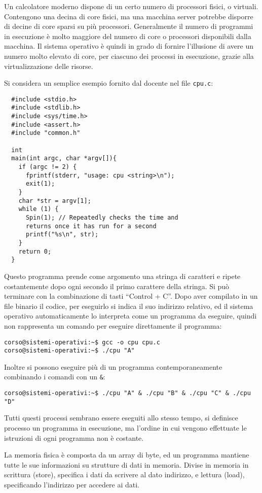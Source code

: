 \documentclass{article}
\numberwithin{equation}{subsection}
\begin{document}
Un calcolatore moderno dispone di un certo numero di processori fisici, o virtuali. Contengono una decina di core fisici, ma una macchina server potrebbe disporre di 
decine di core sparsi su più processori. Generalmente il numero di programmi in esecuzione è molto maggiore del numero di core o processori disponibili dalla macchina. 
Il sistema operativo è quindi in grado di fornire l'illusione di avere un numero molto elevato di core, per ciascuno dei processi in esecuzione, grazie alla virtualizzazione 
delle risorse. 

Si considera un semplice esempio fornito dal docente nel file \verb|cpu.c|:
\begin{verbatim}
  #include <stdio.h>
  #include <stdlib.h>
  #include <sys/time.h>
  #include <assert.h>
  #include "common.h"

  int
  main(int argc, char *argv[]){
    if (argc != 2) {
      fprintf(stderr, "usage: cpu <string>\n");
      exit(1);
    }
    char *str = argv[1];
    while (1) {
      Spin(1); // Repeatedly checks the time and
      returns once it has run for a second
      printf("%s\n", str);
    }
    return 0;
  }
\end{verbatim}


Questo programma prende come argomento una stringa di caratteri e ripete costantemente dopo ogni secondo il primo carattere della stringa. Si può terminare con la 
combinazione di tasti ``Control + C''. Dopo aver compilato in un file binario il codice, per eseguirlo si indica il suo indirizzo relativo, ed il sistema operativo automaticamente lo interpreta come un 
programma da eseguire, quindi non rappresenta un comando per eseguire direttamente il programma:
\begin{verbatim}
corso@sistemi-operativi:~$ gcc -o cpu cpu.c 
corso@sistemi-operativi:~$ ./cpu "A"
\end{verbatim}

Inoltre si possono eseguire più di un programma contemporaneamente combinando i comandi con un \verb|&|:
\begin{verbatim}
corso@sistemi-operativi:~$ ./cpu "A" & ./cpu "B" & ./cpu "C" & ./cpu "D"
\end{verbatim}

Tutti questi processi sembrano essere eseguiti allo stesso tempo, si definisce processo un programma in esecuzione, ma l'ordine in cui vengono effettuate le 
istruzioni di ogni programma non è costante. 

La memoria fisica è composta da un array di byte, ed un programma mantiene tutte le sue informazioni su strutture di dati in memoria. Divise in memoria in scrittura 
(store), specifica i dati da scrivere al dato indirizzo, e lettura (load), specificando l'indirizzo per accedere ai dati. 
\end{document}
